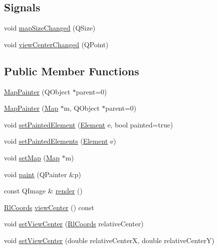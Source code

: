\subsection*{Signals}
\begin{DoxyCompactItemize}
\item 
void \hyperlink{class_map_painter_a8f1f85c58564d01e970bfcaf105e5f9b}{map\+Size\+Changed} (Q\+Size)
\item 
void \hyperlink{class_map_painter_a15c872dbb6a7321b978928df5b850ea3}{view\+Center\+Changed} (Q\+Point)
\end{DoxyCompactItemize}
\subsection*{Public Member Functions}
\begin{DoxyCompactItemize}
\item 
\hyperlink{class_map_painter_a9c1c9ee90336daa528e090334ef67a39}{Map\+Painter} (Q\+Object $\ast$parent=0)
\item 
\hyperlink{class_map_painter_a6d282b26150b3d5b592f307f09b29e4c}{Map\+Painter} (\hyperlink{class_map}{Map} $\ast$m, Q\+Object $\ast$parent=0)
\item 
void \hyperlink{class_map_painter_a8e7486d3743d62d2f3d334c23d38e1c9}{set\+Painted\+Element} (\hyperlink{class_map_painter_a771b3fa246b6c13cc2acbdcf1cb6eee3}{Element} e, bool painted=true)
\item 
void \hyperlink{class_map_painter_aaf546a511fb08c1688ce06392bce1048}{set\+Painted\+Elements} (\hyperlink{class_map_painter_a771b3fa246b6c13cc2acbdcf1cb6eee3}{Element} e)
\item 
void \hyperlink{class_map_painter_a2b1aa596498e0c01c0b53d06d4a598b4}{set\+Map} (\hyperlink{class_map}{Map} $\ast$m)
\item 
void \hyperlink{class_map_painter_a0deb552b94eff8f8751946928d7cd5b8}{paint} (Q\+Painter \&p)
\item 
const Q\+Image \& \hyperlink{class_map_painter_a1c20cf03d0376290481bd80b9f8ef013}{render} ()
\item 
\hyperlink{class_rl_coords}{Rl\+Coords} \hyperlink{class_map_painter_a268279c396ea9502059bf1901f0c686c}{view\+Center} () const
\item 
void \hyperlink{class_map_painter_a435c535da8087a54ba09c71232377508}{set\+View\+Center} (\hyperlink{class_rl_coords}{Rl\+Coords} relative\+Center)
\item 
void \hyperlink{class_map_painter_ae840a2addecd404598ec8300bbd4870f}{set\+View\+Center} (double relative\+CenterX, double relative\+CenterY)

\end{DoxyCompactItemize}
